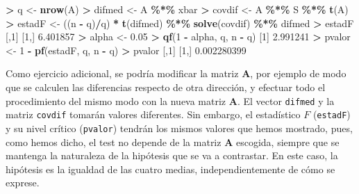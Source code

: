 \documentclass[
  a4paper,
  oneside]{scrbook}
\newenvironment{Shaded}{\begin{snugshade}}{\end{snugshade}}
\newcommand{\DecValTok}[1]{\textcolor[rgb]{0.00,0.00,0.81}{#1}}
\newcommand{\FloatTok}[1]{\textcolor[rgb]{0.00,0.00,0.81}{#1}}
\newcommand{\FunctionTok}[1]{\textcolor[rgb]{0.13,0.29,0.53}{\textbf{#1}}}
\newcommand{\NormalTok}[1]{#1}
\newcommand{\OtherTok}[1]{\textcolor[rgb]{0.56,0.35,0.01}{#1}}
\newcommand{\SpecialCharTok}[1]{\textcolor[rgb]{0.81,0.36,0.00}{\textbf{#1}}}
\theoremstyle{definition}
\theoremstyle{definition}
\theoremstyle{definition}
\theoremstyle{definition}
\theoremstyle{remark}
\begin{document}
\begin{Shaded}
\begin{Highlighting}[]
\SpecialCharTok{\textgreater{}}\NormalTok{ q }\OtherTok{\textless{}{-}} \FunctionTok{nrow}\NormalTok{(A)}
\SpecialCharTok{\textgreater{}}\NormalTok{ difmed }\OtherTok{\textless{}{-}}\NormalTok{ A }\SpecialCharTok{\%*\%}\NormalTok{ xbar}
\SpecialCharTok{\textgreater{}}\NormalTok{ covdif }\OtherTok{\textless{}{-}}\NormalTok{ A }\SpecialCharTok{\%*\%}\NormalTok{ S }\SpecialCharTok{\%*\%} \FunctionTok{t}\NormalTok{(A)}
\SpecialCharTok{\textgreater{}}\NormalTok{ estadF }\OtherTok{\textless{}{-}}\NormalTok{ ((n }\SpecialCharTok{{-}}\NormalTok{ q)}\SpecialCharTok{/}\NormalTok{q) }\SpecialCharTok{*} \FunctionTok{t}\NormalTok{(difmed) }\SpecialCharTok{\%*\%} \FunctionTok{solve}\NormalTok{(covdif) }\SpecialCharTok{\%*\%}\NormalTok{ difmed}
\SpecialCharTok{\textgreater{}}\NormalTok{ estadF}
\NormalTok{         [,}\DecValTok{1}\NormalTok{]}
\NormalTok{[}\DecValTok{1}\NormalTok{,] }\FloatTok{6.401857}
\SpecialCharTok{\textgreater{}}\NormalTok{ alpha }\OtherTok{\textless{}{-}} \FloatTok{0.05}
\SpecialCharTok{\textgreater{}} \FunctionTok{qf}\NormalTok{(}\DecValTok{1} \SpecialCharTok{{-}}\NormalTok{ alpha, q, n }\SpecialCharTok{{-}}\NormalTok{ q)}
\NormalTok{[}\DecValTok{1}\NormalTok{] }\FloatTok{2.991241}
\SpecialCharTok{\textgreater{}}\NormalTok{ pvalor }\OtherTok{\textless{}{-}} \DecValTok{1} \SpecialCharTok{{-}} \FunctionTok{pf}\NormalTok{(estadF, q, n }\SpecialCharTok{{-}}\NormalTok{ q)}
\SpecialCharTok{\textgreater{}}\NormalTok{ pvalor}
\NormalTok{            [,}\DecValTok{1}\NormalTok{]}
\NormalTok{[}\DecValTok{1}\NormalTok{,] }\FloatTok{0.002280399}
\end{Highlighting}
\end{Shaded}

\normalsize

Como ejercicio adicional, se podría modificar la matriz \(\bm{A}\), por
ejemplo de modo que se calculen las diferencias respecto de otra
dirección, y efectuar todo el procedimiento del mismo modo con la nueva
matriz \(\bm{A}\). El vector \texttt{difmed} y la matriz \texttt{covdif} tomarán valores
diferentes. Sin embargo, el estadístico \(F\) (\texttt{estadF}) y su nivel
crítico (\texttt{pvalor}) tendrán los mismos valores que hemos mostrado, pues,
como hemos dicho, el test no depende de la matriz \(\bm{A}\) escogida,
siempre que se mantenga la naturaleza de la hipótesis que se va a
contrastar. En este caso, la hipótesis es la igualdad de las cuatro
medias, independientemente de cómo se exprese.
\end{document}
